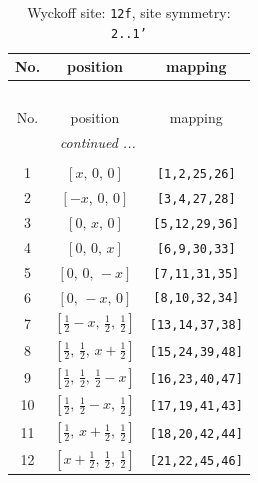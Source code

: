 \documentclass[fleqn,8pt]{jsarticle}
\begin{document}
\begin{longtable}{ccc}
\caption{Wyckoff site: {\tt 12f}, site symmetry: {\tt 2..1'}}
 \\
 \hline \hline
No. & position & mapping \\ \hline \endfirsthead

\multicolumn{2}{l}{\tablename\ \thetable{}} \\
 \hline \hline
No. & position & mapping \\ \hline \endhead

 \hline \hline
\multicolumn{2}{r}{\footnotesize\it continued ...} \\ \endfoot

 \hline \hline
\multicolumn{2}{r}{} \\ \endlastfoot

1 & $\left[ x,\, 0,\, 0 \right]$ & {\tt [1,2,25,26]} \\ \hline
2 & $\left[ - x,\, 0,\, 0 \right]$ & {\tt [3,4,27,28]} \\ \hline
3 & $\left[ 0,\, x,\, 0 \right]$ & {\tt [5,12,29,36]} \\ \hline
4 & $\left[ 0,\, 0,\, x \right]$ & {\tt [6,9,30,33]} \\ \hline
5 & $\left[ 0,\, 0,\, - x \right]$ & {\tt [7,11,31,35]} \\ \hline
6 & $\left[ 0,\, - x,\, 0 \right]$ & {\tt [8,10,32,34]} \\ \hline
7 & $\left[ \frac{1}{2} - x,\, \frac{1}{2},\, \frac{1}{2} \right]$ & {\tt [13,14,37,38]} \\ \hline
8 & $\left[ \frac{1}{2},\, \frac{1}{2},\, x + \frac{1}{2} \right]$ & {\tt [15,24,39,48]} \\ \hline
9 & $\left[ \frac{1}{2},\, \frac{1}{2},\, \frac{1}{2} - x \right]$ & {\tt [16,23,40,47]} \\ \hline
10 & $\left[ \frac{1}{2},\, \frac{1}{2} - x,\, \frac{1}{2} \right]$ & {\tt [17,19,41,43]} \\ \hline
11 & $\left[ \frac{1}{2},\, x + \frac{1}{2},\, \frac{1}{2} \right]$ & {\tt [18,20,42,44]} \\ \hline
12 & $\left[ x + \frac{1}{2},\, \frac{1}{2},\, \frac{1}{2} \right]$ & {\tt [21,22,45,46]} \\
\end{longtable}
\renewcommand{\arraystretch}{1.2}
\end{document}
